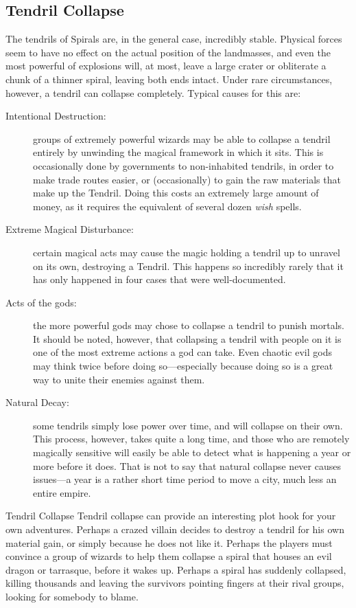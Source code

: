 \begin{multicols*}{2}
\subsection*{Tendril Collapse}
The tendrils of Spirals are, in the general case, incredibly stable.
Physical forces seem to have no effect on the actual position of the landmasses, and even the most powerful of explosions will, at most, leave a large crater or obliterate a chunk of a thinner spiral, leaving both ends intact.
Under rare circumstances, however, a tendril can collapse completely.
Typical causes for this are:
\begin{description}
\item[Intentional Destruction:] groups of extremely powerful wizards may be able to collapse a tendril entirely by unwinding the magical framework in which it sits. 
This is occasionally done by governments to non-inhabited tendrils, in order to make trade routes easier, or (occasionally) to gain the raw materials that make up the Tendril.
Doing this costs an extremely large amount of money, as it requires the equivalent of several dozen \textit{wish} spells.
\item[Extreme Magical Disturbance:] certain magical acts may cause the magic holding a tendril up to unravel on its own, destroying a Tendril.
This happens so incredibly rarely that it has only happened in four cases that were well-documented.
\item[Acts of the gods:] the more powerful gods may chose to collapse a tendril to punish mortals. It should be noted, however, that collapsing a tendril with people on it is one of the most extreme actions a god can take. 
Even chaotic evil gods may think twice before doing so---especially because doing so is a great way to unite their enemies against them.
\item[Natural Decay:] some tendrils simply lose power over time, and will collapse on their own. This process, however, takes quite a long time, and those who are remotely magically sensitive will easily be able to detect what is happening a year or more before it does.
That is not to say that natural collapse never causes issues---a year is a rather short time period to move a city, much less an entire empire.
\end{description}

\begin{adventureidea}{Tendril Collapse}
Tendril collapse can provide an interesting plot hook for your own adventures.
Perhaps a crazed villain decides to destroy a tendril for his own material gain, or simply because he does not like it.
Perhaps the players must convince a group of wizards to help them collapse a spiral that houses an evil dragon or tarrasque, before it wakes up.
Perhaps a spiral has suddenly collapsed, killing thousands and leaving the survivors pointing fingers at their rival groups, looking for somebody to blame.
\end{adventureidea}



\end{multicols*}
